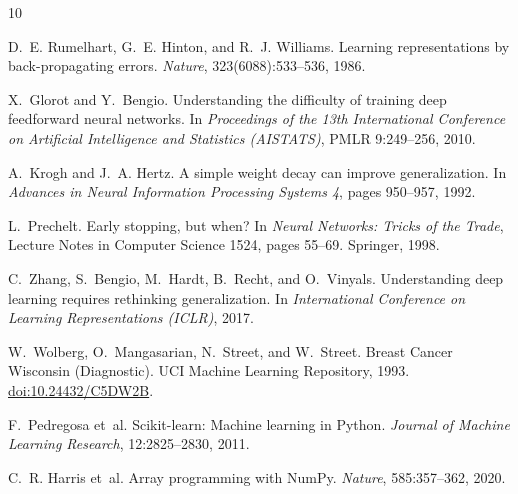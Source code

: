 \documentclass[11pt]{article}
\begin{document}
\begin{thebibliography}{10}

D.~E. Rumelhart, G.~E. Hinton, and R.~J. Williams.
\newblock Learning representations by back-propagating errors.
\newblock \emph{Nature}, 323(6088):533--536, 1986.

X.~Glorot and Y.~Bengio.
\newblock Understanding the difficulty of training deep feedforward neural networks.
\newblock In \emph{Proceedings of the 13th International Conference on Artificial Intelligence and Statistics (AISTATS)}, PMLR 9:249--256, 2010.

A.~Krogh and J.~A. Hertz.
\newblock A simple weight decay can improve generalization.
\newblock In \emph{Advances in Neural Information Processing Systems 4}, pages 950--957, 1992.

L.~Prechelt.
\newblock Early stopping, but when?
\newblock In \emph{Neural Networks: Tricks of the Trade}, Lecture Notes in Computer Science 1524, pages 55--69. Springer, 1998.

C.~Zhang, S.~Bengio, M.~Hardt, B.~Recht, and O.~Vinyals.
\newblock Understanding deep learning requires rethinking generalization.
\newblock In \emph{International Conference on Learning Representations (ICLR)}, 2017.

W.~Wolberg, O.~Mangasarian, N.~Street, and W.~Street.
\newblock Breast Cancer Wisconsin (Diagnostic).
\newblock UCI Machine Learning Repository, 1993.
\newblock \href{https://doi.org/10.24432/C5DW2B}{doi:10.24432/C5DW2B}.

F.~Pedregosa et~al.
\newblock Scikit-learn: Machine learning in Python.
\newblock \emph{Journal of Machine Learning Research}, 12:2825--2830, 2011.

C.~R. Harris et~al.
\newblock Array programming with {NumPy}.
\newblock \emph{Nature}, 585:357--362, 2020.

\end{thebibliography}
\end{document}
